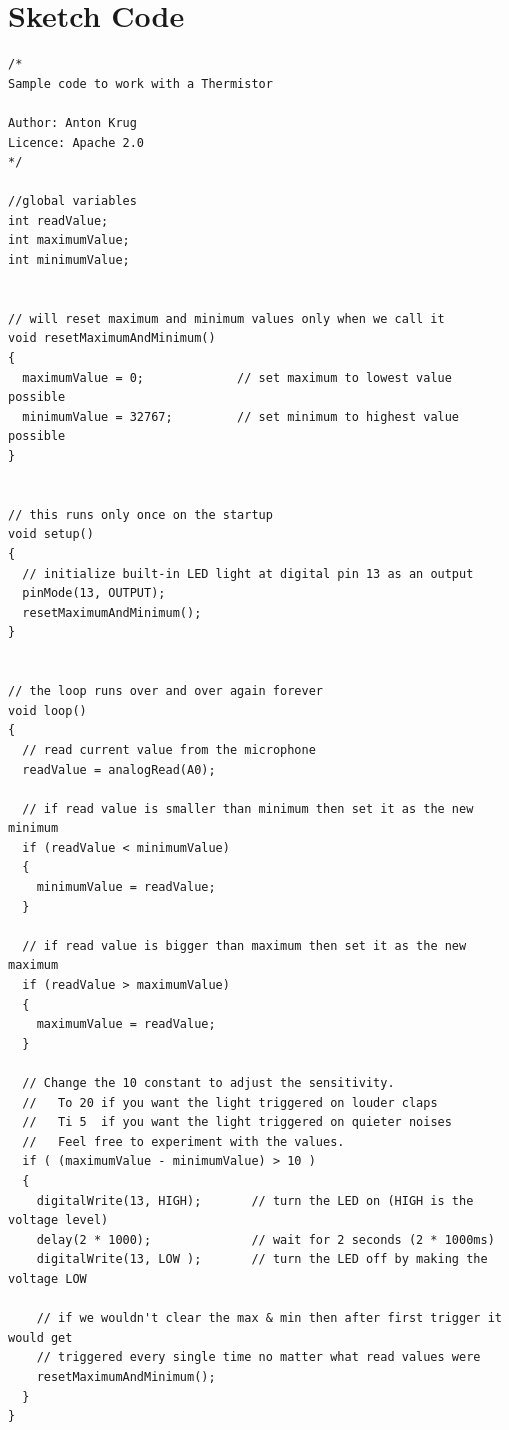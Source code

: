 \newpage
\section*{Sketch Code}
\label{sketch:exp5}
\begin{lstlisting}
/*
Sample code to work with a Thermistor

Author: Anton Krug
Licence: Apache 2.0
*/

//global variables
int readValue;
int maximumValue;
int minimumValue; 


// will reset maximum and minimum values only when we call it
void resetMaximumAndMinimum() 
{
  maximumValue = 0;             // set maximum to lowest value possible
  minimumValue = 32767;         // set minimum to highest value possible
}


// this runs only once on the startup
void setup() 
{
  // initialize built-in LED light at digital pin 13 as an output
  pinMode(13, OUTPUT);           
  resetMaximumAndMinimum();
}


// the loop runs over and over again forever
void loop() 
{
  // read current value from the microphone
  readValue = analogRead(A0);     

  // if read value is smaller than minimum then set it as the new minimum
  if (readValue < minimumValue)   
  {
    minimumValue = readValue;     
  }

  // if read value is bigger than maximum then set it as the new maximum
  if (readValue > maximumValue)   
  {
    maximumValue = readValue;     
  }

  // Change the 10 constant to adjust the sensitivity.
  //   To 20 if you want the light triggered on louder claps   
  //   Ti 5  if you want the light triggered on quieter noises 
  //   Feel free to experiment with the values.
  if ( (maximumValue - minimumValue) > 10 ) 
  {
    digitalWrite(13, HIGH);       // turn the LED on (HIGH is the voltage level)
    delay(2 * 1000);              // wait for 2 seconds (2 * 1000ms)
    digitalWrite(13, LOW );       // turn the LED off by making the voltage LOW

    // if we wouldn't clear the max & min then after first trigger it would get 
    // triggered every single time no matter what read values were
    resetMaximumAndMinimum();     
  }
}

\end{lstlisting}